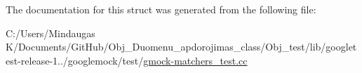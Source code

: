 The documentation for this struct was generated from the following file\+:\begin{DoxyCompactItemize}
\item 
C\+:/\+Users/\+Mindaugas K/\+Documents/\+Git\+Hub/\+Obj\+\_\+\+Duomenu\+\_\+apdorojimas\+\_\+class/\+Obj\+\_\+test/lib/googletest-\/release-\/1../googlemock/test/\mbox{\hyperlink{_obj__test_2lib_2googletest-release-1_88_81_2googlemock_2test_2gmock-matchers__test_8cc}{gmock-\/matchers\+\_\+test.\+cc}}\end{DoxyCompactItemize}
